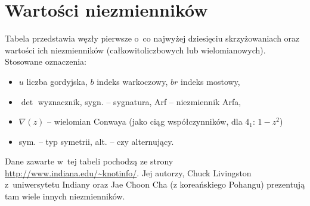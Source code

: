 \section{Wartości niezmienników}
\label{sec:table_of_invariants}
Tabela przedstawia węzły pierwsze o~co najwyżej dziesięciu skrzyżowaniach oraz wartości ich niezmienników (całkowitoliczbowych lub wielomianowych).
Stosowane oznaczenia:
\begin{itemize}
    \item $u$ liczba gordyjska, $b$ indeks warkoczowy, $br$ indeks mostowy,
    \item $\det$ wyznacznik, sygn. -- sygnatura, Arf -- niezmiennik Arfa,
    \item $\nabla(z)$ -- wielomian Conwaya (jako ciąg współczynników, dla $4_1$: $1-z^2$)
    \item sym. -- typ symetrii, alt. -- czy alternujący.
\end{itemize}

Dane zawarte w~tej tabeli pochodzą ze strony \url{http://www.indiana.edu/~knotinfo/}.
Jej autorzy, Chuck Livingston z~uniwersytetu Indiany  oraz Jae Choon Cha (z koreańskiego Pohangu) prezentują tam wiele innych niezmienników.

